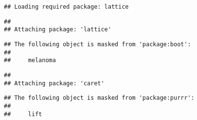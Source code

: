\documentclass[
]{article}
\begin{document}
\begin{verbatim}
## Loading required package: lattice
\end{verbatim}

\begin{verbatim}
## 
## Attaching package: 'lattice'
\end{verbatim}

\begin{verbatim}
## The following object is masked from 'package:boot':
## 
##     melanoma
\end{verbatim}

\begin{verbatim}
## 
## Attaching package: 'caret'
\end{verbatim}

\begin{verbatim}
## The following object is masked from 'package:purrr':
## 
##     lift
\end{verbatim}
\end{document}
